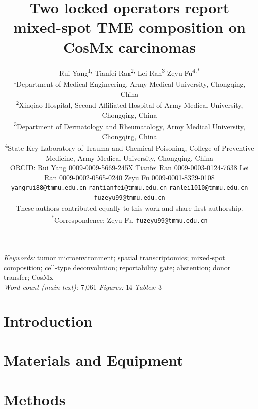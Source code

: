 \documentclass[11pt,a4paper]{article}
\title{Two locked operators report mixed-spot TME composition on CosMx carcinomas}
\author{%
\begin{minipage}{\dimexpr\textwidth-2\tabcolsep\relax}%
\centering
Rui Yang\textsuperscript{1,\dag} \quad Tianfei Ran\textsuperscript{2,\dag} \quad
Lei Ran\textsuperscript{3} \quad Zeyu Fu\textsuperscript{4,*}%
\\[5pt]
{\normalsize\textsuperscript{1}Department of Medical Engineering, Army Medical
University, Chongqing, China}%
\\
{\normalsize\textsuperscript{2}Xinqiao Hospital, Second Affiliated Hospital of
Army Medical University, Chongqing, China}%
\\
{\normalsize\textsuperscript{3}Department of Dermatology and Rheumatology, Army
Medical University, Chongqing, China}%
\\
{\normalsize\textsuperscript{4}State Key Laboratory of Trauma and Chemical
Poisoning, College of Preventive Medicine, Army Medical University, Chongqing,
China}%
\\[5pt]
{\footnotesize ORCID: Rui Yang 0009-0009-5669-245X \quad
Tianfei Ran 0009-0003-0124-7638 \quad
Lei Ran 0009-0002-0565-0240 \quad
Zeyu Fu 0009-0001-8329-0108}%
\\[3pt]
{\footnotesize\texttt{yangrui88@tmmu.edu.cn} \quad \texttt{rantianfei@tmmu.edu.cn}
\quad \texttt{ranlei1010@tmmu.edu.cn} \quad \texttt{fuzeyu99@tmmu.edu.cn}}%
\\[4pt]
{\footnotesize\textsuperscript{\dag}These authors contributed equally to this work
and share first authorship.\quad
\textsuperscript{*}Correspondence: Zeyu Fu, \texttt{fuzeyu99@tmmu.edu.cn}}%
\end{minipage}%
}
\date{}
\begin{document}
\linenumbers
\maketitle
\begin{abstract}

\end{abstract}
\noindent\textit{Keywords:} tumor microenvironment; spatial transcriptomics; mixed-spot composition; cell-type deconvolution; reportability gate; abstention; donor transfer; CosMx
\\[4pt]
\noindent\textit{Word count (main text):} 7{,}061 \quad \textit{Figures:} 14 \quad \textit{Tables:} 3

\section{Introduction}


\FloatBarrier
\section{Materials and Equipment}


\begin{table}[!ht]
\centering
\caption{\protect}
\label{tab:materials}
\small

\end{table}

\FloatBarrier
\section{Methods}


\begin{figure}[!ht]
\centering

\caption{\protect}
\label{fig:protocol}
\end{figure}

\begin{table}[!ht]
\centering
\caption{\protect}
\label{tab:timing}

\end{table}

\end{document}
